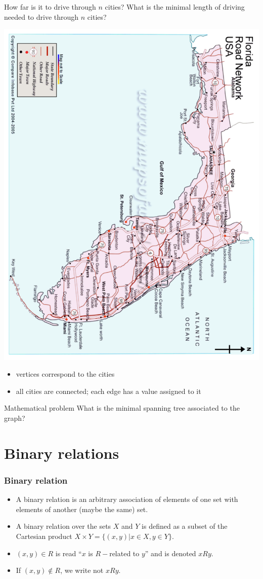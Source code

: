 \documentclass[aspectratio=169]{beamer}
\begin{document}
\begin{frame}{How far is it to drive through $n$ cities?}
	What is the minimal length of driving needed to drive through $n$ cities?
	\begin{center}
	\includegraphics[angle=90,width=.4\textwidth]{FIGS_slides/florida}
	\end{center}
	\begin{itemize}
	\item vertices correspond to the cities
	\item all cities are connected; each edge has a value assigned to it
	\end{itemize}
	\begin{block}{Mathematical problem}
	What is the minimal spanning tree associated to the graph?
	\end{block}
\end{frame}


\section{Binary relations}

\begin{frame}\frametitle{Binary relation}
	\begin{definition}
	\begin{itemize}
	\item A binary relation is an arbitrary association of elements of one set with elements of another (maybe the same) set.
	\item  A binary relation over the sets $X$ and $Y$ is defined as a subset of the Cartesian product $X\times Y =\{(x,y)| x\in X , y\in Y\}$. 
	\item $(x,y)\in R$ is read ``$x$ is $R-$related to $y$'' and is denoted $xRy$.
	\item If $(x,y)\not\in R$, we write not $x R y$.
	\end{itemize}
	\end{definition}
\end{frame}
	
\end{document}
